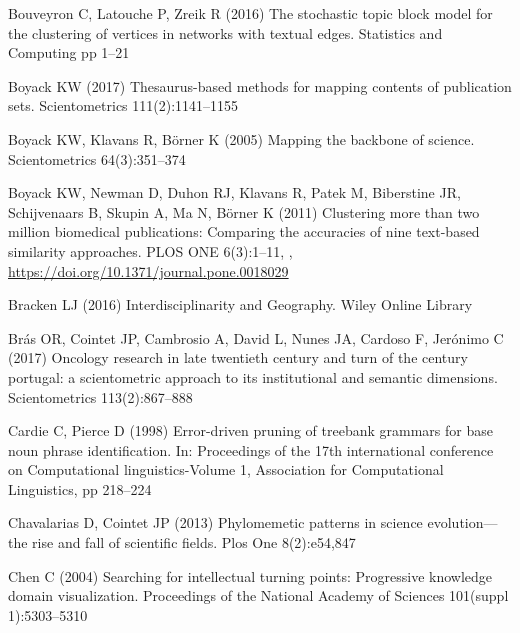 \begin{thebibliography}{84}
Bouveyron C, Latouche P, Zreik R (2016) The stochastic topic block model for
  the clustering of vertices in networks with textual edges. Statistics and
  Computing pp 1--21

Boyack KW (2017) Thesaurus-based methods for mapping contents of publication
  sets. Scientometrics 111(2):1141--1155

Boyack KW, Klavans R, B{\"o}rner K (2005) Mapping the backbone of science.
  Scientometrics 64(3):351--374

Boyack KW, Newman D, Duhon RJ, Klavans R, Patek M, Biberstine JR, Schijvenaars
  B, Skupin A, Ma N, Börner K (2011) Clustering more than two million
  biomedical publications: Comparing the accuracies of nine text-based
  similarity approaches. PLOS ONE 6(3):1--11,
  ,
  \urlprefix\url{https://doi.org/10.1371/journal.pone.0018029}

Bracken LJ (2016) Interdisciplinarity and Geography. Wiley Online Library

Br{\'a}s OR, Cointet JP, Cambrosio A, David L, Nunes JA, Cardoso F,
  Jer{\'o}nimo C (2017) Oncology research in late twentieth century and turn of
  the century portugal: a scientometric approach to its institutional and
  semantic dimensions. Scientometrics 113(2):867--888

Cardie C, Pierce D (1998) Error-driven pruning of treebank grammars for base
  noun phrase identification. In: Proceedings of the 17th international
  conference on Computational linguistics-Volume 1, Association for
  Computational Linguistics, pp 218--224

Chavalarias D, Cointet JP (2013) Phylomemetic patterns in science
  evolution---the rise and fall of scientific fields. Plos One 8(2):e54,847

Chen C (2004) Searching for intellectual turning points: Progressive knowledge
  domain visualization. Proceedings of the National Academy of Sciences
  101(suppl 1):5303--5310


\end{thebibliography}
